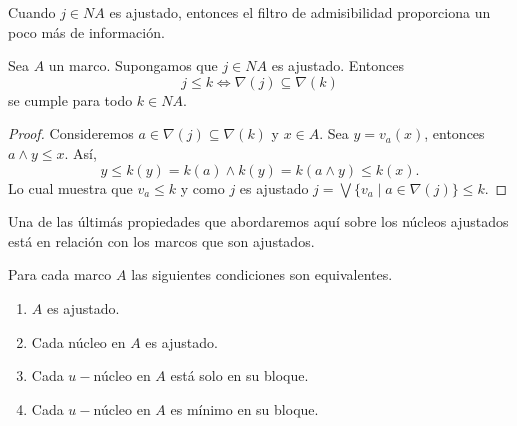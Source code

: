Cuando $j\in NA$ es ajustado, entonces el filtro de admisibilidad proporciona un poco más de información.

\begin{lem}\label{Lema5.5.9}
    Sea $A$ un marco. Supongamos que $j\in NA$ es ajustado. Entonces 
    \[
    j\leq k\Leftrightarrow \nabla(j)\subseteq \nabla(k)
    \]
    se cumple para todo $k\in NA$.
\end{lem}

\begin{proof}
    Consideremos $a\in \nabla(j)\subseteq \nabla(k)$ y $x\in A$. Sea $y=v_a(x)$, entonces $a\wedge y\leq x$. Así, 
    \[
    y\leq k(y)=k(a)\wedge k(y)=k(a\wedge y)\leq k(x).
    \]
    Lo cual muestra que $v_a\leq k$ y como $j$ es ajustado $j=\bigvee\{v_a\mid a\in \nabla(j)\}\leq k$.
\end{proof}

Una de las últimás propiedades que abordaremos aquí sobre los núcleos ajustados está en relación con los marcos que son ajustados.
\begin{thm}\label{Teorema5.5.10}
    Para cada marco $A$ las siguientes condiciones son equivalentes.
    \begin{enumerate}[$i) $]
        \item $A$ es ajustado.
        \item Cada núcleo en $A$ es ajustado.
        \item Cada $u-$núcleo en $A$ está solo en su bloque.
        \item Cada $u-$núcleo en $A$ es mínimo en su bloque.
    \end{enumerate}
\end{thm}

